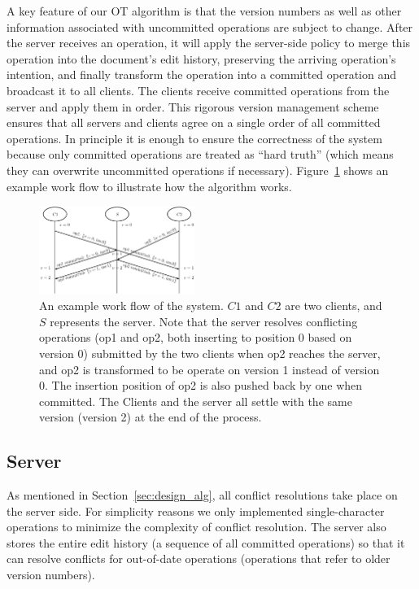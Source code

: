 A key feature of our OT algorithm is that the version numbers as well as other
information associated with uncommitted operations are subject to change. After
the server receives an operation, it will apply the server-side policy to merge
this operation into the document's edit history, preserving the arriving
operation's intention, and finally transform the operation into a committed
operation and broadcast it to all clients. The clients receive committed
operations from the server and apply them in order. This rigorous version
management scheme ensures that all servers and clients agree on a single order
of all committed operations. In principle it is enough to ensure the correctness
of the system because only committed operations are treated as ``hard truth''
(which means they can overwrite uncommitted operations if necessary).
Figure~\ref{fig:walkthrough} shows an example work flow to illustrate how the
algorithm works.

\begin{figure}[t!]
  \centering
  \includegraphics[width=0.45\textwidth]{walkthrough.pdf}

  \caption{An example work flow of the system. $C1$ and $C2$ are two clients,
  and $S$ represents the server. Note that the server resolves conflicting
  operations (op1 and op2, both inserting to position 0 based on version 0)
  submitted by the two clients when op2 reaches the server, and op2 is
  transformed to be operate on version 1 instead of version 0. The insertion
  position of op2 is also pushed back by one when committed. The Clients and the
  server all settle with the same version (version 2) at the end of the
  process.}
  
  \label{fig:walkthrough}
\end{figure}

\subsection{Server}
\label{sec:design_server}

As mentioned in Section~\ref{sec:design_alg}, all conflict resolutions take
place on the server side. For simplicity reasons we only implemented
single-character operations to minimize the complexity of conflict resolution.
The server also stores the entire edit history (a sequence of all committed
operations) so that it can resolve conflicts for out-of-date operations
(operations that refer to older version numbers).

